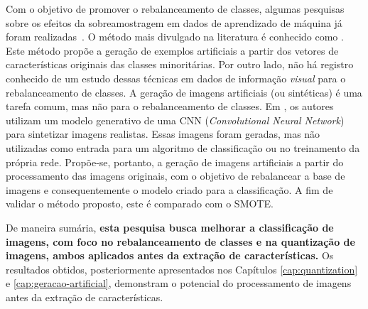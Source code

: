 Com o objetivo de promover o rebalanceamento de classes, algumas pesquisas sobre os efeitos da sobreamostragem em dados de aprendizado de máquina já foram realizadas~\cite{Kuncheva2004,Chawla2002}. O método mais divulgado na literatura é conhecido como . Este método propõe a geração de exemplos artificiais a partir dos vetores de características originais das classes minoritárias. Por outro lado, não há registro conhecido de um estudo dessas técnicas em dados de informação \emph{visual} para o rebalanceamento de classes. A geração de imagens artificiais (ou sintéticas) é uma tarefa comum, mas não para o rebalanceamento de classes. Em , os autores utilizam um modelo generativo de uma CNN (\textit{Convolutional Neural Network}) para sintetizar imagens realistas. Essas imagens foram geradas, mas não utilizadas como entrada para um algoritmo de classificação ou no treinamento da própria rede. Propõe-se, portanto, a geração de imagens artificiais a partir do processamento das imagens originais, com o objetivo de rebalancear a base de imagens e consequentemente o modelo criado para a classificação. A fim de validar o método proposto, este é comparado com o SMOTE.

De maneira sumária, \textbf{esta pesquisa busca melhorar a classificação de imagens, com foco no rebalanceamento de classes e na quantização de imagens, ambos aplicados antes da extração de características.} Os resultados obtidos, posteriormente apresentados nos Capítulos \ref{cap:quantization} e \ref{cap:geracao-artificial}, demonstram o potencial do processamento de imagens antes da extração de características.


